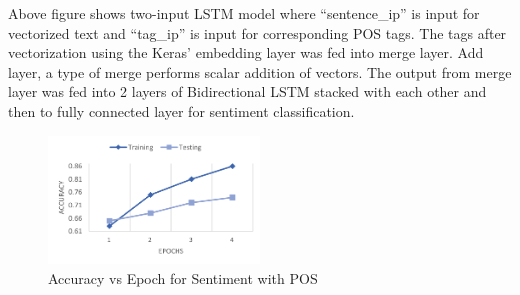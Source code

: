 Above figure shows two-input LSTM model where “sentence_ip” is input for
vectorized text and “tag_ip” is input for corresponding POS tags. The tags after
vectorization using the Keras’ embedding layer was fed into merge layer. Add layer, a
type of merge performs scalar addition of vectors. The output from merge layer was fed
into 2 layers of Bidirectional LSTM stacked with each other and then to fully connected
layer for sentiment classification.
        \begin{figure}[hbt!]
            \centering
                \includegraphics[width=0.5\textwidth]{./img/6.21.png}
                \caption{Accuracy vs Epoch for Sentiment with POS}
        \end{figure}
